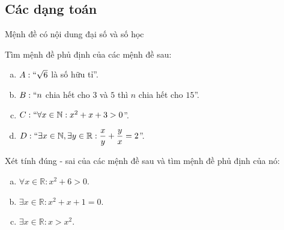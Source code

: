 \subsection{Các dạng toán}
\begin{dang}{Mệnh đề có nội dung đại số và số học}
	
\end{dang}
\begin{vd}
	Tìm mệnh đề phủ định của các mệnh đề sau:
	\begin{enumerate}[a) ]
		\item $A:\text{\textquotedblleft}\sqrt{6}$ là số hữu tỉ\textquotedblright.
		\item $B:\text{\textquotedblleft}n $ chia hết cho $3$ và $5$ thì $n$ chia hết cho $15$\textquotedblright.
		\item $C:\text{\textquotedblleft}\forall x\in \mathbb{N}: x^2+x+3>0$\textquotedblright.
		\item $D:\text{\textquotedblleft}\exists x \in \mathbb{N}, \exists y \in \mathbb{R}: \dfrac{x}{y}+\dfrac{y}{x}=2$\textquotedblright.
	\end{enumerate}
\end{vd}
\begin{vd}
	Xét tính đúng - sai của các mệnh đề sau và tìm mệnh đề phủ định của nó:
	\begin{enumerate}[a) ]
		\item $\forall x \in \mathbb{R}: x^2+6>0$.
		\item $\exists x \in \mathbb{R}: x^2+x+1=0$.
		\item $\exists x \in \mathbb{R}: x>x^2$.
	\end{enumerate}
\end{vd}

